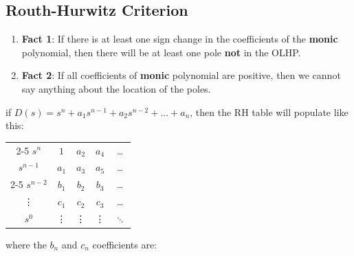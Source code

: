 \documentclass[twocolumn, 12pt]{article}    %
\begin{document}
\subsection*{Routh-Hurwitz Criterion}
\begin{enumerate}
\item \textbf{Fact 1}:
If there is at least one sign change in the coefficients of the \textbf{monic} polynomial, then there will be at least one pole \textbf{not} in the OLHP.\\
\item \textbf{Fact 2}:
If all coefficients of \textbf{monic} polynomial are positive, then we cannot say anything about the location of the poles.
\end{enumerate}
\noindent
if \(D(s) = s^n +a_1s^{n-1} + a_2s^{n-2} +... + a_n\), then the RH table will populate like this:
\begin{table}[H]
    \centering
    \begin{tabular}{c|cccc}
        \cline{2-5}
         \(s^n\) & \(1\)  & \(a_2\) &\(a_4\) & \dots  \\
         \(s^{n-1}\) &  \(a_1\) & \(a_3\) & \(a_5\) & \dots\\
         \cline{2-5}
         \(s^{n-2}\) & \(b_1\) & \(b_2\) & \(b_3\) & \dots\\
         \vdots & \(c_1\) & \(c_2\) & \(c_3\) & \dots\\
         \(s^0\) & \vdots & \vdots & \vdots & \(\ddots\)\\
    \end{tabular}
\end{table}
where the \(b_n\) and \(c_n\) coefficients are:\\
\end{document}
